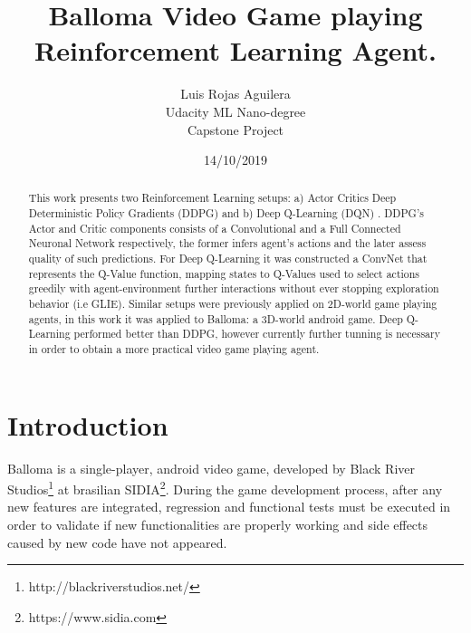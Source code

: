 \documentclass[peerreview,onecolumn]{IEEEtran}
\begin{document}
\title{Balloma Video Game playing Reinforcement Learning Agent.}



\author{Luis Rojas Aguilera \\
Udacity ML Nano-degree\\
Capstone Project\\
}
\date{14/10/2019}

\maketitle
\tableofcontents
\listoffigures
\listoftables

\IEEEpeerreviewmaketitle
\begin{abstract}

This work presents two Reinforcement Learning setups: a) Actor Critics Deep Deterministic Policy Gradients (DDPG) \cite{ddpg_2015} and b) Deep Q-Learning (DQN) \cite{replay_buffer_2015}. DDPG's Actor and Critic components consists of a Convolutional and a Full Connected Neuronal Network respectively, the former infers agent's actions and the later assess quality of such predictions. For Deep Q-Learning it was constructed a ConvNet that represents the Q-Value function, mapping states to Q-Values used to select actions greedily with agent-environment further interactions without ever stopping exploration behavior (i.e GLIE). Similar setups were previously applied on 2D-world game playing agents, in this work it was applied to Balloma: a 3D-world android game. Deep Q-Learning performed better than DDPG, however currently further tunning is necessary in order to obtain a more practical video game playing agent.

\end{abstract}


\section{Introduction}
Balloma is a single-player, android video game, developed by Black River Studios\footnote{http://blackriverstudios.net/} at brasilian SIDIA\footnote{https://www.sidia.com}.  During the game development process, after any new features are integrated, regression and functional tests must be executed in order to validate if new functionalities are properly working and side effects caused by new code have not appeared. 
\end{document}
